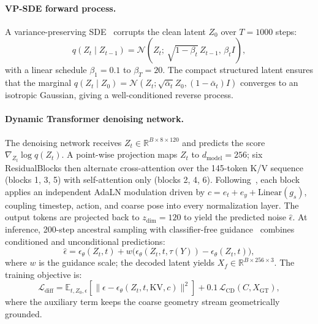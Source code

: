 \documentclass{article}
\newcommand{\Rbb}{\mathbb{R}}
\begin{document}
\paragraph{VP-SDE forward process.}
A variance-preserving SDE~\cite{song2021score,ddpm} corrupts the clean latent $Z_0$ over $T\!=\!1000$ steps:
\begin{equation}
  q(Z_t\mid Z_{t-1})
    = \mathcal{N}\!\left(Z_t;\,\sqrt{1-\beta_t}\,Z_{t-1},\,\beta_t I\right),
\end{equation}
with a linear schedule $\beta_1\!=\!0.1$ to $\beta_T\!=\!20$.
The compact structured latent ensures that the marginal
$q(Z_t\mid Z_0)=\mathcal{N}(Z_t;\sqrt{\bar\alpha_t}Z_0,(1-\bar\alpha_t)I)$
converges to an isotropic Gaussian, giving a well-conditioned reverse process.

\paragraph{Dynamic Transformer denoising network.}
The denoising network receives $Z_t\!\in\!\Rbb^{B\times8\times120}$ and predicts
the score $\nabla_{Z_t}\log q(Z_t)$.
A point-wise projection maps $Z_t$ to $d_\text{model}\!=\!256$;
six ResidualBlocks then alternate cross-attention over the 145-token K/V sequence
(blocks 1, 3, 5) with self-attention only (blocks 2, 4, 6).
Following~\cite{ldt,dit}, each block applies an independent AdaLN modulation driven
by $c = e_t + e_y + \mathrm{Linear}(g_s)$, coupling timestep, action, and coarse
pose into every normalization layer.
The output tokens are projected back to $z_\text{dim}\!=\!120$ to yield the
predicted noise $\hat{\epsilon}$.
At inference, 200-step ancestral sampling with classifier-free guidance~\cite{cfg}
combines conditioned and unconditional predictions:
\begin{equation}
  \hat{\epsilon}
    = \epsilon_\theta(Z_t,t)
      + w\bigl(\epsilon_\theta(Z_t,t,\tau(Y)) - \epsilon_\theta(Z_t,t)\bigr),
\end{equation}
where $w$ is the guidance scale; the decoded latent yields
$X_f\!\in\!\Rbb^{B\times256\times3}$.
The training objective is:
\begin{equation}
  \mathcal{L}_\text{diff}
    = \mathbb{E}_{t,Z_0,\epsilon}\!\left[\|\epsilon - \epsilon_\theta(Z_t,t,\mathrm{KV},c)\|^2\right]
    + 0.1\,\mathcal{L}_\text{CD}(C, X_\text{GT}),
\end{equation}
where the auxiliary term keeps the coarse geometry stream geometrically grounded.

\end{document}
